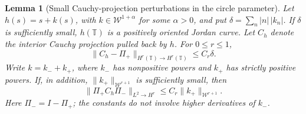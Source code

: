 \documentclass[11pt]{article}
\newtheorem{lemma}[proposition]{Lemma}
\newcommand{\T}{\mathbb T}
\begin{document}
\begin{lemma}[Small Cauchy-projection perturbations in the circle parameter]
\label{lem:wiener-cauchy-projections}
Let $h(s)=s+k(s)$, with
$k\in\mathcal W^{1+\alpha}$ for some $\alpha>0$, and put
$\delta=\sum_n |n|\,|k_n|$. If $\delta$ is sufficiently small,
$h(\T)$ is a positively oriented Jordan curve. Let $C_h$ denote
the interior Cauchy projection pulled back by $h$. For $0\le r\le1$,
\[
 \|C_h-\Pi_+\|_{H^r(\T)\to H^r(\T)}\le C_r\delta .
\]
Write $k=k_-+k_+$, where $k_-$ has nonpositive powers and $k_+$
has strictly positive powers. If, in addition,
$\|k_+\|_{\mathcal W^{r+1}}$ is sufficiently small, then
\[
 \|\Pi_+C_h\Pi_-\|_{L^2\to H^r}
       \le C_r\|k_+\|_{\mathcal W^{r+1}}.
\]
Here $\Pi_-=I-\Pi_+$; the constants do not involve higher derivatives
of $k_-$.
\end{lemma}
\end{document}
